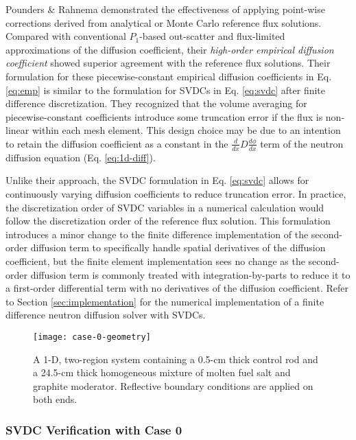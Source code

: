 Pounders \& Rahnema \cite{pounders_diffusion_2009} demonstrated the effectiveness of applying
point-wise corrections derived from analytical or Monte Carlo reference flux solutions. Compared
with conventional $P_1$-based out-scatter and flux-limited approximations of the diffusion
coefficient, their \textit{high-order empirical diffusion coefficient} showed superior agreement
with the reference flux solutions. Their formulation for these piecewise-constant empirical
diffusion coefficients in Eq. \ref{eq:emp} is similar to the formulation for \glspl{SVDC} in Eq.
\ref{eq:svdc} after finite difference discretization. They recognized that the volume
averaging for piecewise-constant coefficients introduce some truncation error if the flux is
non-linear within each mesh element. This design choice may be due to an intention to retain the
diffusion coefficient as a constant in the $\frac{d}{dx}D\frac{d\phi}{dx}$ term of the neutron
diffusion equation (Eq. \ref{eq:1d-diff}).

Unlike their approach, the \gls{SVDC} formulation in Eq. \ref{eq:svdc} allows for continuously
varying diffusion coefficients to reduce truncation error. In practice, the discretization order of
\gls{SVDC} variables in a numerical calculation would follow the discretization order of the
reference flux solution. This formulation introduces a minor change to the finite difference
implementation of the second-order diffusion term to specifically handle spatial derivatives of the
diffusion coefficient, but the finite element implementation sees no change as the second-order
diffusion term is commonly treated with integration-by-parts to reduce it to a first-order
differential term with no derivatives of the diffusion coefficient. Refer to Section
\ref{sec:implementation} for the numerical implementation of a finite difference neutron diffusion
solver with \glspl{SVDC}.

\begin{figure}[htb!]
  \centering
  \texttt{[image: case-0-geometry]}
  \caption{A 1-D, two-region system containing a 0.5-cm thick control rod and a 24.5-cm thick
    homogeneous mixture of molten fuel salt and graphite moderator. Reflective boundary conditions
    are applied on both ends.}
  \label{fig:case-0-geom}
\end{figure}

\subsubsection{\gls{SVDC} Verification with Case 0}

